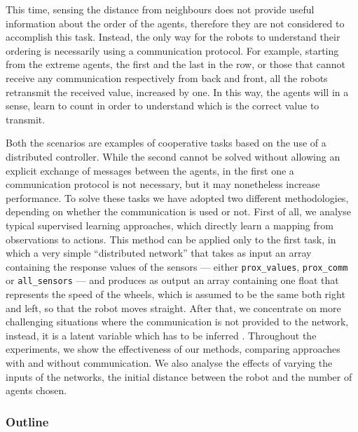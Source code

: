 This time, sensing the distance from neighbours does not provide useful 
information about the order of the agents, therefore they are not considered to 
accomplish this task. Instead, the only way for the robots to understand their 
ordering is necessarily using a communication protocol. For example, starting 
from the extreme agents, the first and the last in the row, or those that cannot 
receive any communication respectively from back and front, all the robots 
retransmit the received value, increased by one. In this way, the agents will in a 
sense, learn to count in order to understand which is the correct value to transmit.

Both the scenarios are examples of cooperative tasks based on the use of a 
distributed controller. While the second cannot be solved without allowing an 
explicit exchange of messages between the agents, in the first one a 
communication protocol is not necessary, but it may nonetheless increase 
performance.
To solve these tasks we have adopted two different methodologies, depending on 
whether the communication is used or not.
First of all, we analyse typical supervised learning approaches, which directly learn 
a mapping from observations to actions. This method can be applied only to the 
first task, in which a very simple ``distributed network'' that takes as input an 
array containing the response values of the sensors — either 
\texttt{prox\_values},  \texttt{prox\_comm} or  \texttt{all\_sensors} — and 
produces as output an array containing one float that represents the speed of the 
wheels, which is assumed to be the same both right and left, so that the robot 
moves straight.
After that, we concentrate on more challenging situations where the 
communication is not provided to the network, instead, it is a latent variable 
which has to be inferred \cite[][]{le2017coordinated}.
Throughout the experiments, we show the effectiveness of our methods, 
comparing approaches with and without communication. We also analyse the 
effects of varying the inputs of the networks, the initial distance between the 
robot and the number of agents chosen.

\subsubsection*{Outline}
\label{subsec:outline}

